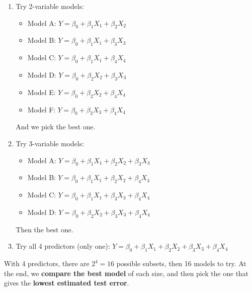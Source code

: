 \begin{examplebox}
\begin{enumerate}
        \item Try 2-variable models:
        \begin{itemize}
            \item Model A: $Y = \beta_0 + \beta_1 X_1 + \beta_2 X_2$
            \item Model B: $Y = \beta_0 + \beta_1 X_1 + \beta_3 X_3$
            \item Model C: $Y = \beta_0 + \beta_1 X_1 + \beta_4 X_4$
            \item Model D: $Y = \beta_0 + \beta_2 X_2 + \beta_3 X_3$
            \item Model E: $Y = \beta_0 + \beta_2 X_2 + \beta_4 X_4$
            \item Model F: $Y = \beta_0 + \beta_3 X_3 + \beta_4 X_4$
        \end{itemize}
        And we pick the best one.
        \item Try 3-variable models:
        \begin{itemize}
            \item Model A: $Y = \beta_0 + \beta_1 X_1 + \beta_2 X_2 + \beta_3 X_3$
            \item Model B: $Y = \beta_0 + \beta_1 X_1 + \beta_2 X_2 + \beta_4 X_4$
            \item Model C: $Y = \beta_0 + \beta_1 X_1 + \beta_3 X_3 + \beta_4 X_4$
            \item Model D: $Y = \beta_0 + \beta_2 X_2 + \beta_3 X_3 + \beta_4 X_4$
        \end{itemize}
        Then the best one.
        \item Try all 4 predictors (only one): $Y = \beta_0 + \beta_1 X_1 + \beta_2 X_2 + \beta_3 X_3 + \beta_4 X_4$
    \end{enumerate}
    With 4 predictors, there are $2^4 = 16$ possible subsets, then 16 models to try. At the end, we \textbf{compare the best model} of each size, and then pick the one that gives the \textbf{lowest estimated test error}.
\end{examplebox}